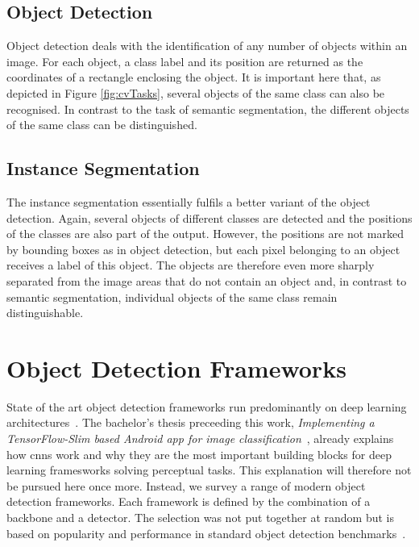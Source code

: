\documentclass[
			   fontsize=11pt,
               paper=a4,
               bibliography=totoc,
               idxtotoc,
               headsepline,
               footsepline,
               footinclude=false,
               BCOR=12mm,
               DIV=13,
               openany,   %
               ]
               {scrbook}
\begin{document}
\subsection{Object Detection}
Object detection deals with the identification of any number of objects within an image. For each object, a class label and its position are returned as the coordinates of a rectangle enclosing the object. It is important here that, as depicted in Figure \ref{fig:cvTasks}, several objects of the same class can also be recognised. In contrast to the  task of semantic segmentation, the different objects of the same class can be distinguished.

\subsection{Instance Segmentation}
The instance segmentation essentially fulfils a better variant of the object detection. Again, several objects of different classes are detected and the positions of the classes are also part of the output. However, the positions are not marked by bounding boxes as in object detection, but each pixel belonging to an object receives a label of this object. The objects are therefore even more sharply separated from the image areas that do not contain an object and, in contrast to semantic segmentation, individual objects of the same class remain distinguishable.


\section{Object Detection Frameworks}

State of the art object detection frameworks run predominantly on deep learning architectures~\cite{dlForDetection}. The bachelor's thesis preceeding this work, \textit{Implementing a TensorFlow-Slim based Android app for image classification}~\cite{maxJokel}, already explains how \glspl{cnn} work and why they are the most important building blocks for deep learning framesworks solving perceptual tasks. This explanation will therefore not be pursued here once more. Instead, we survey a range of modern object detection frameworks. Each framework is defined by the combination of a backbone and a detector. The selection was not put together at random but is based on popularity and performance in standard object detection benchmarks~\cite{backbones}. %
\end{document}
